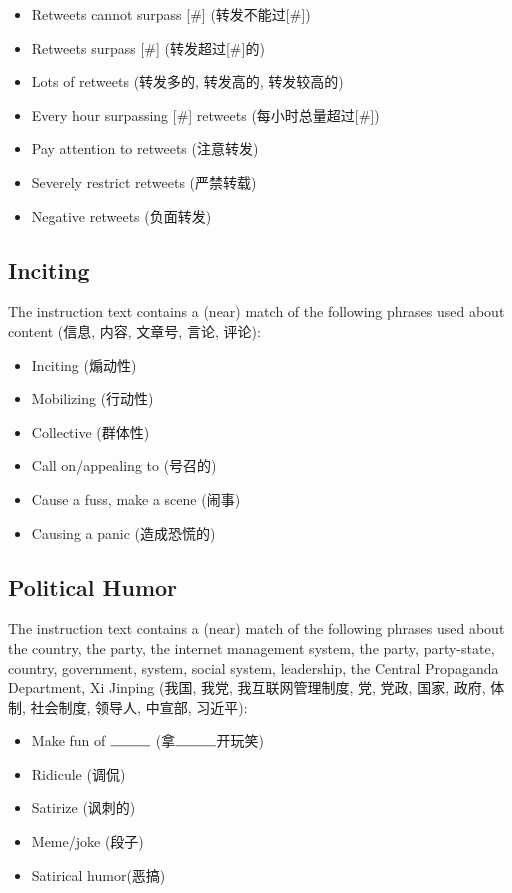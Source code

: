 \documentclass[12pt]{article}
\begin{document}
\begin{CJK*}{UTF8}{gbsn}
\begin{itemize}[noitemsep]
	\item Retweets cannot surpass [\#] (转发不能过[\#])
	\item Retweets surpass [\#] (转发超过[\#]的)
	\item Lots of retweets (转发多的, 转发高的, 转发较高的)
	\item Every hour surpassing [\#] retweets (每小时总量超过[\#])
	\item Pay attention to retweets (注意转发)
	\item Severely restrict retweets (严禁转载)
	\item Negative retweets (负面转发)
\end{itemize}

\subsection{Inciting}

The instruction text contains a (near) match of the following phrases used about content (信息, 内容, 文章号, 言论, 评论):

\begin{itemize}[noitemsep]
	\item Inciting (煽动性)
	\item Mobilizing (行动性)
	\item Collective (群体性)
	\item Call on/appealing to (号召的)
	\item Cause a fuss, make a scene (闹事)
	\item Causing a panic (造成恐慌的)
\end{itemize}

\subsection{Political Humor}

The instruction text contains a (near) match of the following phrases used about the country, the party, the internet management system, the party, party-state, country, government, system, social system, leadership, the Central Propaganda Department, Xi Jinping (我国, 我党, 我互联网管理制度, 党, 党政, 国家, 政府, 体制, 社会制度, 领导人, 中宣部, 习近平):

\begin{itemize}[noitemsep]
	\item Make fun of $\rule{1cm}{0.15mm}$ (拿$\rule{1cm}{0.15mm}$开玩笑)
	\item Ridicule (调侃)
	\item Satirize (讽刺的)
	\item Meme/joke (段子)
	\item Satirical humor(恶搞)
\end{itemize}



\end{CJK*}
\end{document}
